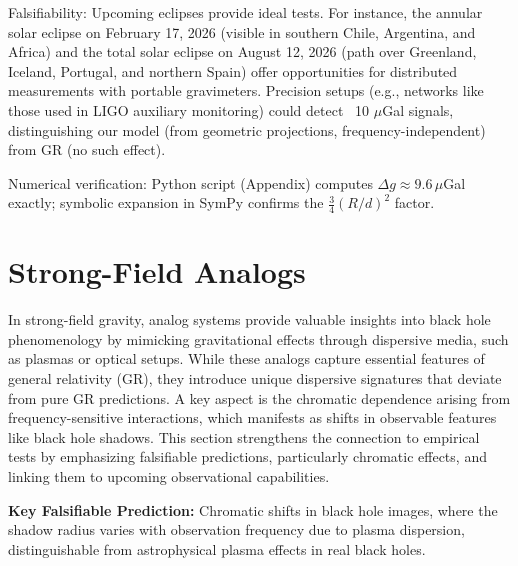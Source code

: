 \documentclass{article}
\begin{document}
Falsifiability: Upcoming eclipses provide ideal tests. For instance, the annular solar eclipse on February 17, 2026 (visible in southern Chile, Argentina, and Africa) and the total solar eclipse on August 12, 2026 (path over Greenland, Iceland, Portugal, and northern Spain) offer opportunities for distributed measurements with portable gravimeters. Precision setups (e.g., networks like those used in LIGO auxiliary monitoring) could detect ~10 $\mu$Gal signals, distinguishing our model (from geometric projections, frequency-independent) from GR (no such effect).

Numerical verification: Python script (Appendix) computes $\Delta g \approx 9.6 \, \mu$Gal exactly; symbolic expansion in SymPy confirms the $\frac{3}{4} (R/d)^2$ factor.

\medskip
\noindent
{}
\medskip


\section{Strong-Field Analogs}

In strong-field gravity, analog systems provide valuable insights into black hole phenomenology by mimicking gravitational effects through dispersive media, such as plasmas or optical setups. While these analogs capture essential features of general relativity (GR), they introduce unique dispersive signatures that deviate from pure GR predictions. A key aspect is the chromatic dependence arising from frequency-sensitive interactions, which manifests as shifts in observable features like black hole shadows. This section strengthens the connection to empirical tests by emphasizing falsifiable predictions, particularly chromatic effects, and linking them to upcoming observational capabilities.

\begin{framed}
\textbf{Key Falsifiable Prediction:} Chromatic shifts in black hole images, where the shadow radius varies with observation frequency due to plasma dispersion, distinguishable from astrophysical plasma effects in real black holes.
\end{framed}
\end{document}
